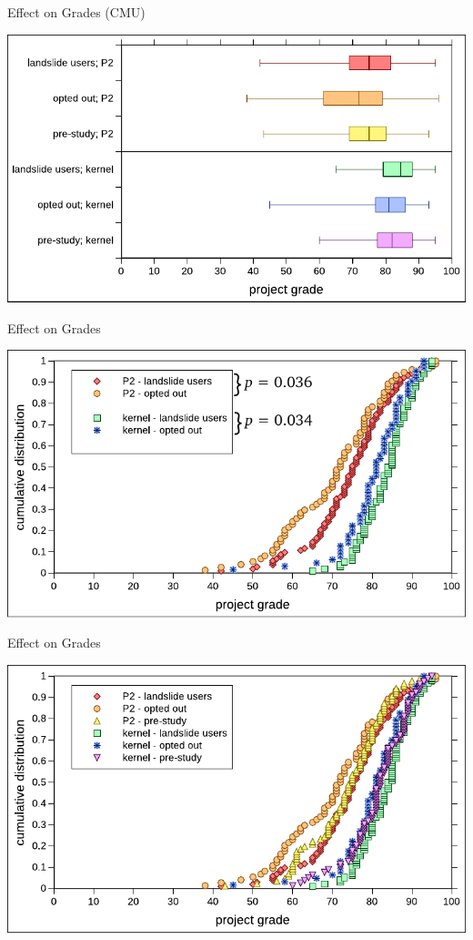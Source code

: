 \documentclass[xcolor=dvipsnames]{beamer}
\begin{document}
\begin{frame}{Effect on Grades (CMU)}
	\begin{center}
		\includegraphics[width=\textwidth]{../photo-of-ze-studence.pdf}
	\end{center}
\end{frame}

\begin{frame}{Effect on Grades}
	\begin{center}
		\includegraphics[width=\textwidth]{photo-of-ze-studence-cdf-no-pre-study.pdf}
	\end{center}
\end{frame}

\begin{frame}{Effect on Grades}
	\begin{center}
		\includegraphics[width=\textwidth]{../photo-of-ze-studence-cdf.pdf}
	\end{center}
\end{frame}
\end{document}
